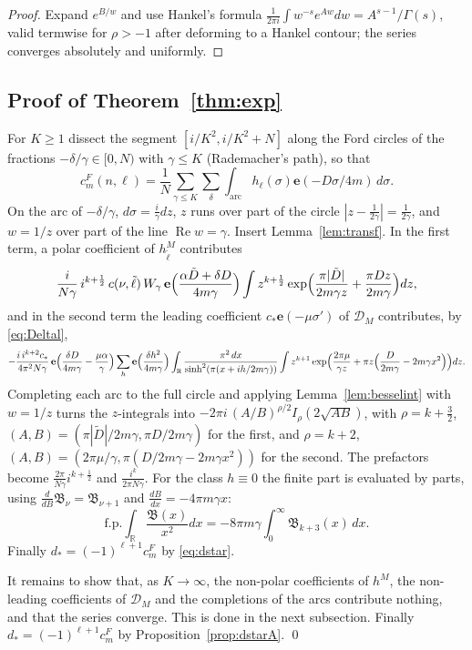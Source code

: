 \documentclass[11pt]{amsart}
\numberwithin{equation}{section}
\theoremstyle{plain}
\theoremstyle{definition}
\theoremstyle{remark}
\newcommand{\R}{\mathbb{R}}
\newcommand{\e}{\mathbf{e}}
\begin{document}
\begin{proof}
Expand $e^{B/w}$ and use Hankel's formula $\frac1{2\pi i}\int w^{-s}e^{Aw}dw=A^{s-1}/\Gamma(s)$, valid termwise for $\rho>-1$ after deforming to a Hankel contour; the series converges absolutely and uniformly.
\end{proof}

\subsection{Proof of Theorem~\ref{thm:exp}}
For $K\ge1$ dissect the segment $[i/K^2,i/K^2+N]$ along the Ford circles of the fractions $-\delta/\gamma\in[0,N)$ with $\gamma\le K$ (Rademacher's path), so that
\[
c^F_m(n,\ell)=\frac1N\sum_{\gamma\le K}\sum_\delta\int_{\text{arc}}h_\ell(\sigma)\e(-D\sigma/4m)\,d\sigma .
\]
On the arc of $-\delta/\gamma$, $d\sigma=\frac i\gamma dz$, $z$ runs over part of the circle $|z-\frac1{2\gamma}|=\frac1{2\gamma}$, and $w=1/z$ over part of the line $\operatorname{Re}w=\gamma$. Insert Lemma~\ref{lem:transf}. In the first term, a polar coefficient of $h^M_{\tilde\ell}$ contributes
\[
\frac{i}{N\gamma}\,i^{k+\frac12}\,c(\nu,\tilde\ell)\,W_\gamma\,\e\Bigl(\frac{\alpha\tilde D+\delta D}{4m\gamma}\Bigr)\int z^{k+\frac12}\exp\Bigl(\frac{\pi|\tilde D|}{2m\gamma z}+\frac{\pi Dz}{2m\gamma}\Bigr)dz,
\]
and in the second term the leading coefficient $c_*\e(-\mu\sigma')$ of $\mathcal D_M$ contributes, by \eqref{eq:Deltal},
\[
-\frac{i\,i^{k+2}c_*}{4\pi^2N\gamma}\,\e\Bigl(\frac{\delta D}{4m\gamma}-\frac{\mu\alpha}{\gamma}\Bigr)\sum_h\e\Bigl(\frac{\delta h^2}{4m\gamma}\Bigr)\int_\R\frac{\pi^2\,dx}{\sinh^2(\pi(x+ih/2m\gamma))}\int z^{k+1}\exp\Bigl(\frac{2\pi\mu}{\gamma z}+\pi z\Bigl(\frac{D}{2m\gamma}-2m\gamma x^2\Bigr)\Bigr)dz .
\]
Completing each arc to the full circle and applying Lemma~\ref{lem:besselint} with $w=1/z$ turns the $z$-integrals into $-2\pi i\,(A/B)^{\rho/2}I_\rho(2\sqrt{AB})$, with $\rho=k+\frac32$, $(A,B)=(\pi|\tilde D|/2m\gamma,\pi D/2m\gamma)$ for the first, and $\rho=k+2$, $(A,B)=(2\pi\mu/\gamma,\pi(D/2m\gamma-2m\gamma x^2))$ for the second. The prefactors become $\frac{2\pi}{N\gamma}i^{k+\frac12}$ and $\frac{i^k}{2\pi N\gamma}$. For the class $h\equiv0$ the finite part is evaluated by parts, using $\frac{d}{dB}\mathfrak B_\nu=\mathfrak B_{\nu+1}$ and $\frac{dB}{dx}=-4\pi m\gamma x$:
\[
\mathrm{f.p.}\!\int_\R\frac{\mathfrak B(x)}{x^2}dx=-8\pi m\gamma\int_0^\infty\mathfrak B_{k+3}(x)\,dx .
\]
Finally $d_*=(-1)^{\ell+1}c^F_m$ by \eqref{eq:dstar}.

It remains to show that, as $K\to\infty$, the non-polar coefficients of $h^M$, the non-leading coefficients of $\mathcal D_M$ and the completions of the arcs contribute nothing, and that the series converge. This is done in the next subsection. Finally $d_*=(-1)^{\ell+1}c^F_m$ by Proposition~\ref{prop:dstarA}. \qed
\end{document}
